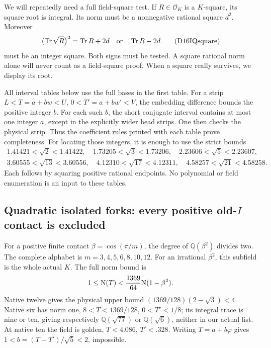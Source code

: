 \documentclass[11pt]{article}
\begin{document}
We will repeatedly need a full
field-square test.
If \(R\in\mathcal O_K\) is a \(K\)-square,
its square root is integral.
Its norm must be a nonnegative
rational square \(d^2\).
Moreover
\[
             \bigl(\operatorname{Tr}\sqrt R\bigr)^2
                 =\operatorname{Tr}R+2d
                    \quad\hbox{or}\quad
                   \operatorname{Tr}R-2d
\tag{D16IQsquare}\label{eq:arithD16Iquadraticsquare}
\]
must be an integer square.
Both signs must be tested.
A square rational norm alone will
never count as a field-square proof.
When a square really survives,
we display its root.

All interval tables below use the
full bases in the first table.
For a strip \(L<T=a+bw<U\),
\(0<T'=a+bw'<V\), the embedding
difference bounds the positive
integer \(b\).
For each such \(b\), the short
conjugate interval contains at most
one integer \(a\), except in the
explicitly wider head strips.
One then checks the physical strip.
Thus the coefficient rules printed
with each table prove completeness.
For locating those integers, it is
enough to use the strict bounds
\[
\begin{gathered}
1.41421<\sqrt2<1.41422,\quad
1.73205<\sqrt3<1.73206,\quad
2.23606<\sqrt5<2.23607,\\
3.60555<\sqrt{13}<3.60556,\quad
4.12310<\sqrt{17}<4.12311,\quad
4.58257<\sqrt{21}<4.58258 .
\end{gathered}
\]
Each follows by squaring positive
rational endpoints.
No polynomial or field enumeration
is an input to these tables.

\subsection{Quadratic isolated forks: every positive old-\(I\) contact is excluded}
\label{app:arithD16Iquadraticcontacts}

For a positive finite contact
\(\beta=\cos(\pi/m)\), the degree
of \(\mathbb Q(\beta^2)\) divides two.
The complete alphabet is
\(m=3,4,5,6,8,10,12\).
For an irrational \(\beta^2\), this
subfield is the whole actual \(K\).
The full norm bound is
\[
             1\le\mathrm N(T)<
                    {1369\over64}\mathrm N(1-\beta^2).
\]
Native twelve gives the physical
upper bound
\((1369/128)(2-\sqrt3)<4\).
Native six has norm one,
\(8<T<1369/128\), \(0<T'<1/8\);
its integral trace is nine or ten,
giving respectively \(\mathbb Q(\sqrt{77})\)
or \(\mathbb Q(\sqrt6)\), neither
in our actual list.
At native ten the field is golden,
\(T<4.086\), \(T'<.328\).
Writing \(T=a+b\varphi\) gives
\(1<b=(T-T')/\sqrt5<2\), impossible.
\end{document}

